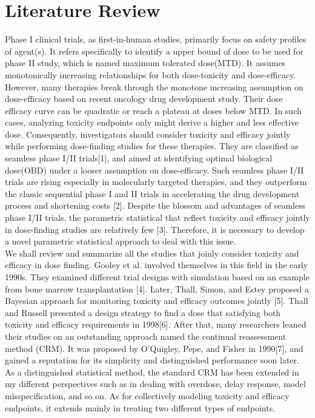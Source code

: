 \documentclass[12pt]{article}
\begin{document}
\section{Literature Review}
Phase I clinical trials, as first-in-human studies, primarily focus on safety profiles of agent(s). It refers specifically to identify a upper bound of dose to be used for phase II study, which is named maximum tolerated dose(MTD). It assumes monotonically increasing relationships for both dose-toxicity and dose-efficacy. However, many therapies break through the monotone increasing assumption on dose-efficacy based on recent oncology drug development study. Their dose efficacy curve can be quadratic or reach a plateau at doses below MTD. In such cases, analyzing toxicity endpoints only might derive a higher and less effective dose. Consequently, investigators should consider toxicity and efficacy jointly while performing dose-finding studies for these therapies. They are classified as seamless phase I/II trials[1], and aimed at identifying optimal biological dose(OBD) under a looser assumption on dose-efficacy. Such seamless phase I/II trials are rising especially in molecularly targeted therapies, and they outperform the classic sequential phase I and II trials in accelerating the drug development process and shortening costs [2]. Despite the blossom and advantages of seamless phase I/II trials, the parametric statistical that reflect toxicity and efficacy jointly in dose-finding studies are relatively few [3]. Therefore, it is necessary to develop a novel parametric statistical approach to deal with this issue.\\
 We shall review and summarize all the studies that joinly consider toxicity and efficacy in dose finding. Gooley et al. involved themselves in this field in the early 1990s. They examined different trial designs with simulation based on an example from bone marrow transplantation [4]. Later, Thall, Simon, and Estey proposed a Bayesian approach for monitoring toxicity and efficacy outcomes jointly [5]. Thall and Russell presented a design strategy to find a dose that satisfying both toxicity and efficacy requirements in 1998[6]. After that, many researchers leaned their studies on an outstanding approach named the continual reassessment method (CRM). It was proposed by O'Quigley, Pepe, and Fisher in 1990[7], and gained a reputation for its simplicity and distinguished performance soon later. \\
As a distinguished statistical method, the standard CRM has been extended in my different perspectives such as in dealing with overdose, delay response, model misspecification, and so on. As for collectively modeling toxicity and efficacy endpoints, it extends mainly in treating two different types of endpoints.\\
\end{document}
